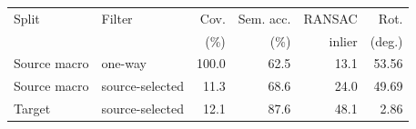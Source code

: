 \begin{tabular}{llrrrr}
\toprule
Split & Filter & Cov. & Sem. acc. & RANSAC & Rot. \\ 
 & & (\%) & (\%) & inlier & (deg.) \\ 
\midrule
Source macro & one-way & 100.0 & 62.5 & 13.1 & 53.56 \\
Source macro & source-selected & 11.3 & 68.6 & 24.0 & 49.69 \\
Target & source-selected & 12.1 & 87.6 & 48.1 & 2.86 \\
\bottomrule
\end{tabular}
